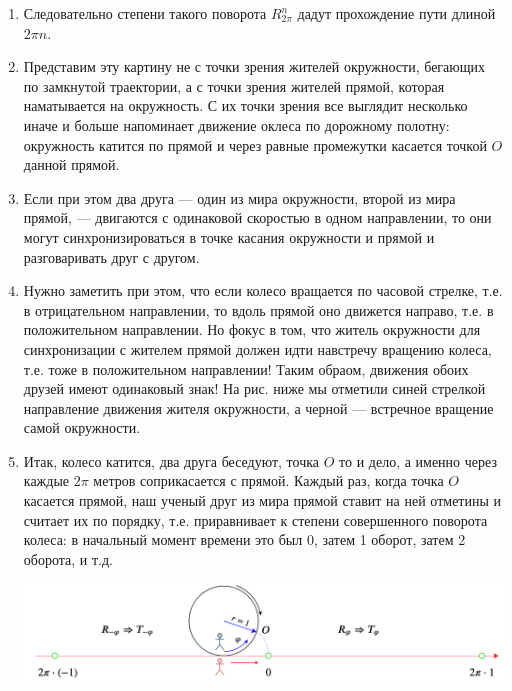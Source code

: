 \begin{enumerate}
\item Следовательно степени такого поворота $R_{2\pi}^n$ дадут прохождение пути длиной $2\pi n$.
\item Представим эту картину не с точки зрения жителей окружности, бегающих по замкнутой траектории, а с точки зрения жителей прямой, которая наматывается на окружность. С их точки зрения все выглядит несколько иначе и больше напоминает движение оклеса по дорожному полотну: окружность катится по прямой и через равные промежутки касается точкой $O$ данной прямой.
\item Если при этом два друга --- один из мира окружности, второй из мира прямой, --- двигаются с одинаковой скоростью в одном направлении, то они могут синхронизироваться в точке касания окружности и прямой и разговаривать друг с другом.
\item Нужно заметить при этом, что если колесо вращается по часовой стрелке, т.е. в отрицательном направлении, то вдоль прямой оно движется направо, т.е. в положительном направлении. Но фокус в том, что житель окружности для синхронизации с жителем прямой должен идти навстречу вращению колеса, т.е. тоже в положительном направлении! Таким обраом, движения обоих друзей имеют одинаковый знак! На рис. ниже мы отметили синей стрелкой направление движения жителя окружности, а черной --- встречное вращение самой окружности.
\item Итак, колесо катится, два друга беседуют, точка $O$ то и дело, а именно через каждые $2\pi$ метров соприкасается с прямой. Каждый раз, когда точка $O$ касается прямой, наш ученый друг из мира прямой ставит на ней отметины и считает их по порядку, т.е. приравнивает к степени совершенного поворота колеса: в начальный момент времени это был 0, затем 1 оборот, затем 2 оборота, и т.д.

\begin{center}
\includegraphics[scale=0.2]{RundLine.png}
\end{center}


\end{enumerate}
